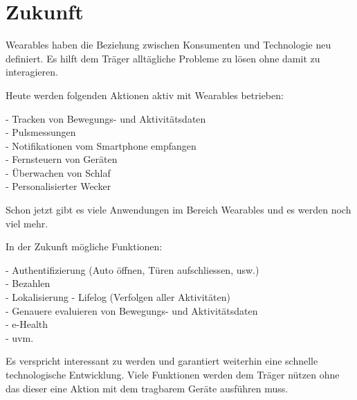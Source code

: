 \section{Zukunft}
\label{sec:teil1_zukunft}

Wearables haben die Beziehung zwischen Konsumenten und Technologie neu definiert.
Es hilft dem Träger alltägliche Probleme zu lösen ohne damit zu interagieren.

Heute werden folgenden Aktionen aktiv mit Wearables betrieben:

- Tracken von Bewegungs- und Aktivitätsdaten \\
- Pulsmessungen \\
- Notifikationen vom Smartphone empfangen \\
- Fernsteuern von Geräten \\
- Überwachen von Schlaf \\
- Personalisierter Wecker

Schon jetzt gibt es viele Anwendungen im Bereich Wearables und es werden noch viel mehr.

In der Zukunft mögliche Funktionen:

- Authentifizierung (Auto öffnen, Türen aufschliessen, usw.) \\
- Bezahlen \\
- Lokalisierung \newline
- Lifelog (Verfolgen aller Aktivitäten) \\
- Genauere evaluieren von Bewegungs- und Aktivitätsdaten \\
- e-Health \\
- uvm. 

Es verspricht interessant zu werden und garantiert weiterhin eine schnelle technologische Entwicklung.
Viele Funktionen werden dem Träger nützen ohne das dieser eine Aktion mit dem tragbarem Geräte ausführen muss.
